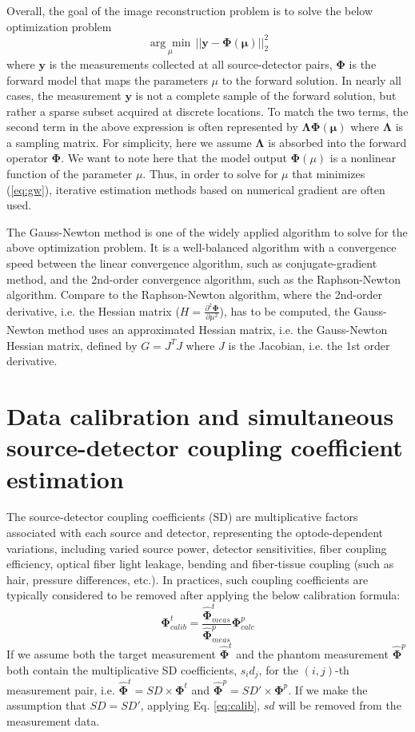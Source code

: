 \documentclass{article}
\begin{document}
Overall, the goal of the image reconstruction problem is to solve the below optimization problem
\begin{equation}\label{eq:gw}
\underset{\mu}{\arg\min} \, || \mathbf{y-\Phi(\mu)} ||^2_2
\end{equation}
where $\mathbf y$ is the measurements collected at all source-detector pairs, $\mathbf\Phi$ is the forward model that maps the parameters $\mu$ to the forward solution. In nearly all cases, the measurement $\mathbf y$ is not a complete sample of the forward solution, but rather a sparse subset acquired at discrete locations. To match the two terms, the second term in the above expression is often represented by $\mathbf{\Lambda\Phi(\mu)}$ where $\mathbf\Lambda$ is a sampling matrix. For simplicity, here we assume $\mathbf\Lambda$ is absorbed into the forward operator $\mathbf\Phi$. We want to note here that the model output $\mathbf\Phi(\mu)$ is a nonlinear function of the parameter $\mu$. Thus, in order to solve for $\mu$ that minimizes (\ref{eq:gw}), iterative estimation methods based on numerical gradient are often used.

The Gauss-Newton method is one of the widely applied algorithm to solve for the above optimization problem. It is a well-balanced algorithm with a convergence speed between the linear convergence algorithm, such as conjugate-gradient method, and the 2nd-order convergence algorithm, such as the Raphson-Newton algorithm. Compare to the Raphson-Newton algorithm, where the 2nd-order derivative, i.e. the Hessian matrix ($H=\frac{\partial^2 \mathbf\Phi}{\partial\mu^2}$), has to be computed, the Gauss-Newton method uses an approximated Hessian matrix, i.e. the Gauss-Newton Hessian matrix, defined by $G=J^TJ$ where $J$ is the Jacobian, i.e. the 1st order derivative.


\section{Data calibration and simultaneous source-detector coupling coefficient estimation}
The source-detector coupling coefficients (SD) are multiplicative factors associated with each source and detector, representing the optode-dependent variations, including varied source power, detector sensitivities, fiber coupling efficiency, optical fiber light leakage, bending and fiber-tissue coupling (such as hair, pressure differences, etc.). In practices, such coupling coefficients are typically considered to be removed after applying the below calibration formula:
\begin{equation}\label{eq:calib}
\mathbf{\Phi}^{t}_{calib}=\frac{\hat{\mathbf{\Phi}}^{t}_{meas}}{\hat{\mathbf{\Phi}}^{p}_{meas}}\mathbf{\Phi}_{calc}^{p}
\end{equation}
If we assume both the target measurement $\hat{\mathbf{\Phi}}^{t}$ and the phantom measurement $\hat{\mathbf{\Phi}}^{p}$ both contain the multiplicative SD coefficients, $s_id_j$, for the $(i,j)$-th measurement pair, i.e. $\hat{\mathbf{\Phi}}^{t}=SD\times\mathbf{\Phi}^{t}$ and $\hat{\mathbf{\Phi}}^{p}=SD'\times\mathbf{\Phi}^{p}$. If we make the assumption that $SD=SD'$, applying Eq. \ref{eq:calib}, $sd$ will be removed from the measurement data.
\end{document}
